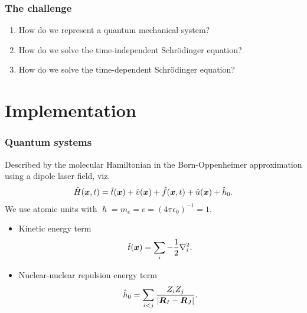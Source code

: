 \documentclass{beamer}
\begin{document}
\begin{frame}
    \frametitle{The challenge}
    \begin{enumerate}
        \item How do we represent a quantum mechanical system?
        \item How do we solve the time-independent Schrödinger equation?
        \item How do we solve the time-dependent Schrödinger equation?
    \end{enumerate}
\end{frame}

\section{Implementation}

\begin{frame}
    \frametitle{Quantum systems}
    Described by the molecular Hamiltonian in the Born-Oppenheimer approximation
    using a dipole laser field, viz.
    \begin{align}
        \hat{H}(\boldsymbol{x}, t)
        = \hat{t}(\boldsymbol{x})
        + \hat{v}(\boldsymbol{x})
        + \hat{f}(\boldsymbol{x}, t)
        + \hat{u}(\boldsymbol{x})
        + \hat{h}_0.
    \end{align}
    We use atomic units with $\hslash = m_e = e = (4\pi\epsilon_0)^{-1} = 1$.
    \begin{itemize}
        \item Kinetic energy term
            \begin{align}
                \hat{t}(\boldsymbol{x})
                = \sum_{i}-\frac{1}{2}\nabla^{2}_i.
            \end{align}
        \item Nuclear-nuclear repulsion energy term
            \begin{align}
                \hat{h}_0
                = \sum_{i < j}\frac{Z_i Z_j}{\abs{\boldsymbol{R}_I - \boldsymbol{R}_J}}.
            \end{align}
    \end{itemize}
\end{frame}
\end{document}
